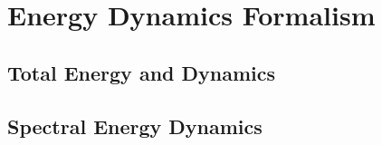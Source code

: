 \chapter{Energy Dynamics Formalism}

\section{Total Energy and Dynamics}

\section{Spectral Energy Dynamics}

